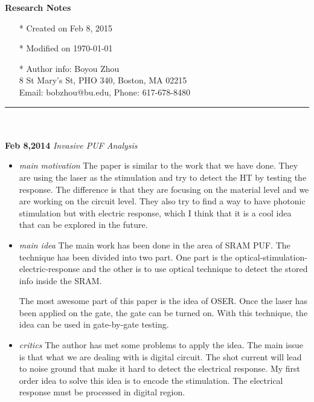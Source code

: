 \documentclass[]{article}
\begin{document}
\pagestyle{empty}
{\large\textbf{Research Notes}}
\begin{itemize}
    \item[*] Created on Feb 8, 2015
    \item[*] Modified on \today
    \item[*] Author info: Boyou Zhou\\
             8 St Mary's St, PHO 340, Boston, MA 02215\\
             Email: bobzhou@bu.edu, Phone: 617-678-8480
\end{itemize}


\rule[-0.1cm]{7.5in}{0.01cm}\\
\\
\noindent \textbf{Feb 8,2014}
\textit{Invasive PUF Analysis}
\indent		\begin{itemize}
            \item \textit{main motivation}
            The paper is similar to the work that we have done. They are using
            the laser as the stimulation and try to detect the HT by testing the
            response. The difference is that they are focusing on the material
            level and we are working on the circuit level. They also try to find
            a way to have photonic stimulation but with electric response, which
            I think that it is a cool idea that can be explored in the future.

            \item \textit{main idea}
            The main work has been done in the area of SRAM PUF. The technique
            has been divided into two part. One part is the
            optical-stimulation-electric-response and the other is to use
            optical technique to detect the stored info inside the SRAM.
            
            The most awesome part of this paper is the idea of OSER. Once the
            laser has been applied on the gate, the gate can be turned on. With
            this technique, the idea can be used in gate-by-gate testing.

            \item \textit{critics}
            The author has met some problems to apply the idea. The main issue
            is that what we are dealing with is digital circuit. The shot
            current will lead to noise ground that make it hard to detect the
            electrical response. My first order idea to solve this idea is to
            encode the stimulation. The electrical response must be processed in
            digital region.
        \end{itemize}
\end{document}
